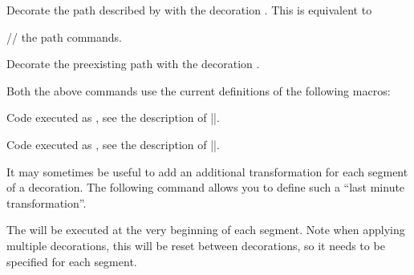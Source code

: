 \begin{command}{\pgfdecoratepath{}}
    Decorate the path described by  with the decoration
    . This is equivalent to
\begin{codeexample}
  // the path commands.
\endpgfdecorate
\end{codeexample}
\end{command}

\begin{command}{\pgfdecoratecurrentpath{}}
    Decorate the preexisting path with the decoration .
\end{command}

Both the above commands use the current definitions of the following macros:

\begin{command}{\pgfdecoratebeforecode}
    Code executed as , see the description of |\pgfdecorate|.
\end{command}

\begin{command}{\pgfdecorateaftercode}
    Code executed as , see the description of |\pgfdecorate|.
\end{command}

It may sometimes be useful to add an additional transformation for each segment
of a decoration. The following command allows you to define such a ``last
minute transformation''.

\begin{command}{\pgfsetdecorationsegmenttransformation{}}
    The  will be executed at the very beginning of each segment.
    Note when applying multiple decorations, this will be reset between
    decorations, so it needs to be specified for each segment.
\begin{codeexample}[preamble={\usetikzlibrary{decorations,decorations.pathmorphing}}]
\end{codeexample}
\end{command}


